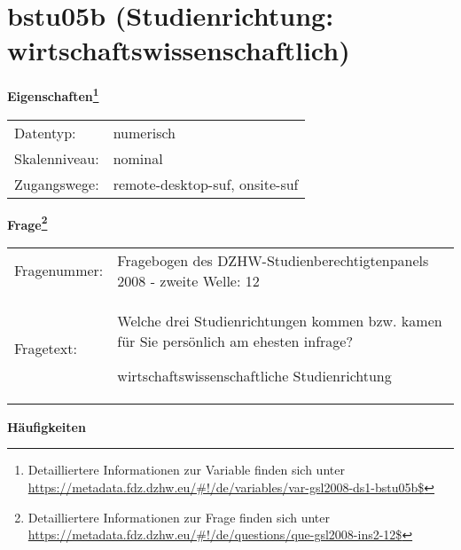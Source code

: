 
    \setcounter{footnote}{0}

    \vspace*{-1.8cm}
	\section{bstu05b (Studienrichtung: wirtschaftswissenschaftlich)}
	\label{section:bstu05b}



    \vspace*{0.5cm}
    \noindent\textbf{Eigenschaften\footnote{Detailliertere Informationen zur Variable finden sich unter
		\url{https://metadata.fdz.dzhw.eu/\#!/de/variables/var-gsl2008-ds1-bstu05b$}}}\\
	\begin{tabularx}{\hsize}{@{}lX}
	Datentyp: & numerisch \\
	Skalenniveau: & nominal \\
	Zugangswege: &
	  remote-desktop-suf, 
	  onsite-suf
 \\
    \end{tabularx}



				\vspace*{0.5cm}
                \noindent\textbf{Frage\footnote{Detailliertere Informationen zur Frage finden sich unter
		              \url{https://metadata.fdz.dzhw.eu/\#!/de/questions/que-gsl2008-ins2-12$}}}\\
				\begin{tabularx}{\hsize}{@{}lX}
					Fragenummer: &
					  Fragebogen des DZHW-Studienberechtigtenpanels 2008 - zweite Welle:
					  12
 \\
					Fragetext: & Welche drei Studienrichtungen kommen bzw. kamen für Sie persönlich am ehesten infrage?\par  wirtschaftswissenschaftliche Studienrichtung \\
				\end{tabularx}





        		\vspace*{0.5cm}
                \noindent\textbf{Häufigkeiten}

